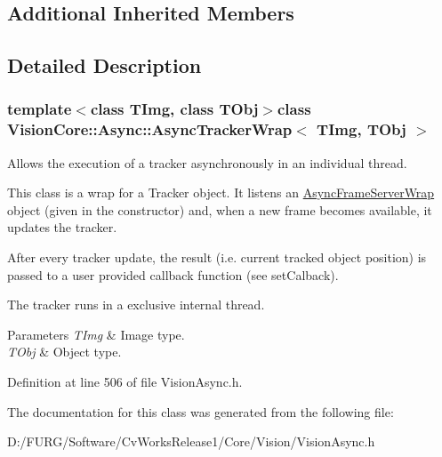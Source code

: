 \subsection*{Additional Inherited Members}


\subsection{Detailed Description}
\subsubsection*{template$<$class T\+Img, class T\+Obj$>$class Vision\+Core\+::\+Async\+::\+Async\+Tracker\+Wrap$<$ T\+Img, T\+Obj $>$}

Allows the execution of a tracker asynchronously in an individual thread. 

This class is a wrap for a Tracker object. It listens an \hyperlink{class_vision_core_1_1_async_1_1_async_frame_server_wrap}{Async\+Frame\+Server\+Wrap} object (given in the constructor) and, when a new frame becomes available, it updates the tracker.

After every tracker update, the result (i.\+e. current tracked object position) is passed to a user provided callback function (see set\+Calback).

The tracker runs in a exclusive internal thread.


\begin{DoxyParams}{Parameters}
{\em T\+Img} & Image type. \\
\hline
{\em T\+Obj} & Object type. \\
\hline
\end{DoxyParams}


Definition at line 506 of file Vision\+Async.\+h.



The documentation for this class was generated from the following file\+:\begin{DoxyCompactItemize}
\item 
D\+:/\+F\+U\+R\+G/\+Software/\+Cv\+Works\+Release1/\+Core/\+Vision/Vision\+Async.\+h\end{DoxyCompactItemize}
